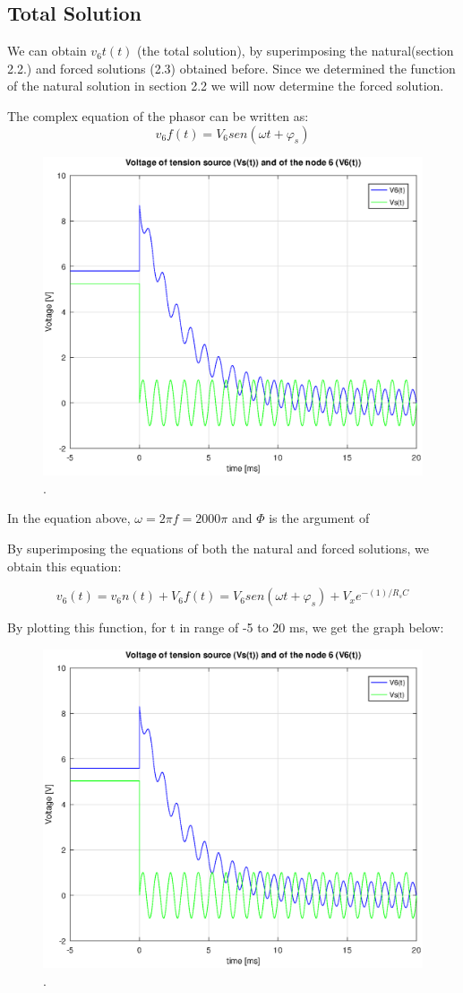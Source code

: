 \subsection{Total Solution}
We can obtain $v_6t(t)$ (the total solution), by superimposing the natural(section 2.2.) and forced solutions (2.3) obtained before. Since we determined the function of the natural solution in section 2.2 we will now determine the forced solution.

The complex equation of the phasor can be written as:
\begin{equation}
	v_6f(t) = V_6sen(\omega t + \varphi_s)
\end{equation}

\begin{figure}[h] \centering
\includegraphics[width=0.6\linewidth]{forced_solution.eps}
\caption{.}
\label{fig:rc2}
\end{figure}


In the equation above, $\omega = 2\pi f = 2000\pi$ and $\varPhi$ is the argument of 

By superimposing the equations of both the natural and forced solutions, we obtain this equation:

\begin{equation}
	v_6(t) = v_6n(t) + V_6f(t) = V_6sen(\omega t + \varphi_s) + V_xe^{-(1)/R_sC}
\end{equation}

By plotting this function, for t in range of -5 to 20 ms, we get the graph below:


\begin{figure}[h] \centering
\includegraphics[width=0.6\linewidth]{total_solution.eps}
\caption{.}
\label{fig:rc3}
\end{figure}

